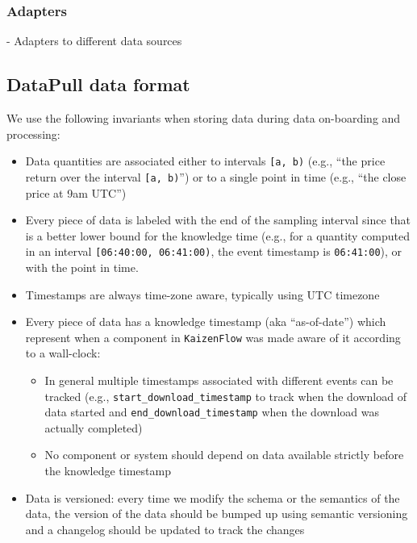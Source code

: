 \documentclass[11pt, reqno]{amsart}
\theoremstyle{definition}
\theoremstyle{remark}
\begin{document}
  \subsubsection{Adapters}

  - Adapters to different data sources

  \subsection{DataPull data format}

  We use the following invariants when storing data during data on-boarding and processing:

  \begin{itemize}
    \item Data quantities are associated either to intervals \verb|[a, b)| (e.g.,
      ``the price return over the interval \verb|[a, b)|'') or to a single point
      in time (e.g., ``the close price at 9am UTC'')

    \item Every piece of data is labeled with the end of the sampling interval since
      that is a better lower bound for the knowledge time (e.g., for a quantity
      computed in an interval \verb|[06:40:00, 06:41:00)|, the event timestamp is
      \verb|06:41:00|), or with the point in time.

    \item Timestamps are always time-zone aware, typically using UTC timezone

    \item Every piece of data has a knowledge timestamp (aka ``as-of-date'') which
      represent when a component in \verb|KaizenFlow| was made aware of it according
      to a wall-clock:
      \begin{itemize}
        \item In general multiple timestamps associated with different events can
          be tracked (e.g., \verb|start_download_timestamp| to track when the
          download of data started and \verb|end_download_timestamp| when the
          download was actually completed)

        \item No component or system should depend on data available strictly before
          the knowledge timestamp
      \end{itemize}

    \item Data is versioned: every time we modify the schema or the semantics of
      the data, the version of the data should be bumped up using semantic versioning
      and a changelog should be updated to track the changes
  \end{itemize}
\end{document}
